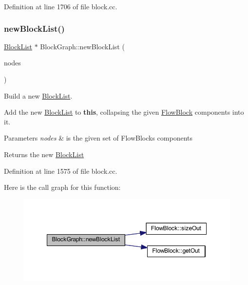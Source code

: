 Definition at line 1706 of file block.\+cc.

\mbox{\label{class_block_graph_aafe64866a81e07fdb5eb92ab74a171ac}} 
\subsubsection{\texorpdfstring{newBlockList()}{newBlockList()}}
{\footnotesize\ttfamily \mbox{\hyperlink{class_block_list}{Block\+List}} $\ast$ Block\+Graph\+::new\+Block\+List (\begin{DoxyParamCaption}\item[{const vector$<$ \mbox{\hyperlink{class_flow_block}{Flow\+Block}} $\ast$ $>$ \&}]{nodes }\end{DoxyParamCaption})}



Build a new \mbox{\hyperlink{class_block_list}{Block\+List}}. 

Add the new \mbox{\hyperlink{class_block_list}{Block\+List}} to {\bfseries{this}}, collapsing the given \mbox{\hyperlink{class_flow_block}{Flow\+Block}} components into it. 
\begin{DoxyParams}{Parameters}
{\em nodes} & is the given set of Flow\+Blocks components \\
\hline
\end{DoxyParams}
\begin{DoxyReturn}{Returns}
the new \mbox{\hyperlink{class_block_list}{Block\+List}} 
\end{DoxyReturn}


Definition at line 1575 of file block.\+cc.

Here is the call graph for this function\+:
\nopagebreak
\begin{figure}[H]
\begin{center}
\leavevmode
\includegraphics[width=348pt]{class_block_graph_aafe64866a81e07fdb5eb92ab74a171ac_cgraph}
\end{center}
\end{figure}
\mbox{\label{class_block_graph_aea5dbfcf345da8fe5fa335b07613e1af}} 
